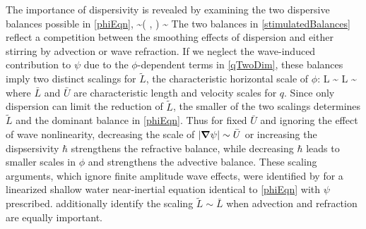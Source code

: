 \documentclass[12pt, oneside]{book}
\begin{document}
\begin{subappendices}
The importance of dispersivity is revealed by examining the two dispersive balances possible in \eqref{phiEqn}, 
\beq
\hbar \hlap \phi \sim \J \left ( \psi, \phi \right ) \com \qquad {} \qquad \hbar \hlap \phi \sim \phi \hlap \psi \per
\label{stimulatedBalances}
\eeq
The two balances in \eqref{stimulatedBalances} reflect a competition between the smoothing effects of dispersion and either stirring by advection or wave refraction.  If we neglect the wave-induced contribution to $\psi$ due to the $\phi$-dependent terms in \eqref{qTwoDim}, these balances imply two distinct scalings for $\tilde L$, the characteristic horizontal scale of $\phi$:
\beq
{} \tilde L \sim {}  \qquad \qquad {} \qquad \qquad {} \tilde L \sim {} \com
\label{stimulatedScalings}
\eeq
where $\bar L$ and $\bar U$ are characteristic length and velocity scales for $q$.  Since only dispersion can limit the reduction of $\tilde L$, the smaller of the two scalings determines $\tilde L$ and the dominant balance in \eqref{phiEqn}.  Thus for fixed $\bar U$ and ignoring the effect of wave nonlinearity, decreasing the scale of $| \boldsymbol \nabla \psi |\sim \bar U$ or increasing the dispsersivity $\hbar$ strengthens the refractive balance, while decreasing $\hbar$ leads to smaller scales in $\phi$ and strengthens the advective balance.  These scaling arguments, which ignore finite amplitude wave effects, were identified by \citet{danioux2015concentration} for a linearized shallow water near-inertial equation identical to \eqref{phiEqn} with $\psi$ prescribed.  \citet{danioux2015concentration} additionally identify the scaling $\tilde L \sim \bar L$ when advection and refraction are equally important.  


\end{subappendices}
\end{document}
